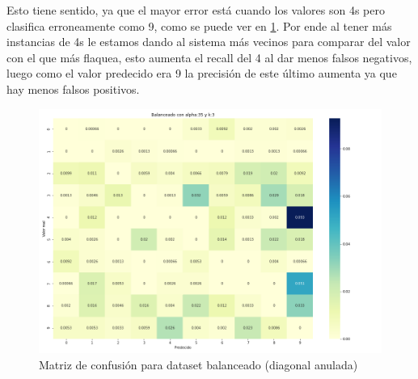 \FloatBarrier
Esto tiene sentido, ya que el mayor error está cuando los valores son 4s pero clasifica erroneamente como 9, como se puede ver en \ref{fig:bal_conf}. Por ende al tener más instancias de 4s le estamos dando al sistema más vecinos para comparar del valor con el que más flaquea, esto aumenta el recall del 4 al dar menos falsos negativos, luego como el valor predecido era 9 la precisión de este último aumenta ya que hay menos falsos positivos.
\begin{figure}[h]
 \centering
 \includegraphics[width=0.8\linewidth]{images/balanceo/Balanceado con alpha:35 y k:3_3795.png}
 \caption{Matriz de confusión para dataset balanceado (diagonal anulada)}
 \label{fig:bal_conf}
\end{figure}

